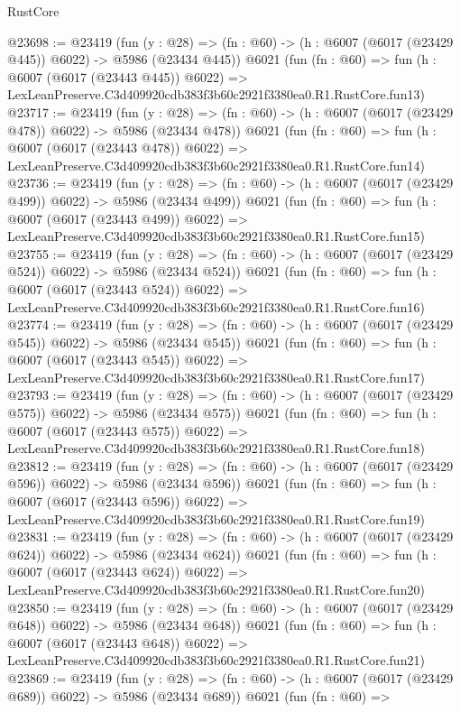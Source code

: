 \begin{lexlean}{RustCore}
\begin{coremodule}
@23698 := @23419
    (fun (y : @28) => (fn : @60) -> (h : @6007 (@6017 (@23429 @445)) @6022) -> @5986 (@23434 @445))
    @6021
    (fun (fn : @60) =>
    fun (h : @6007 (@6017 (@23443 @445)) @6022) =>
    LexLeanPreserve.C3d409920cdb383f3b60c2921f3380ea0.R1.RustCore.fun13)
@23717 := @23419
    (fun (y : @28) => (fn : @60) -> (h : @6007 (@6017 (@23429 @478)) @6022) -> @5986 (@23434 @478))
    @6021
    (fun (fn : @60) =>
    fun (h : @6007 (@6017 (@23443 @478)) @6022) =>
    LexLeanPreserve.C3d409920cdb383f3b60c2921f3380ea0.R1.RustCore.fun14)
@23736 := @23419
    (fun (y : @28) => (fn : @60) -> (h : @6007 (@6017 (@23429 @499)) @6022) -> @5986 (@23434 @499))
    @6021
    (fun (fn : @60) =>
    fun (h : @6007 (@6017 (@23443 @499)) @6022) =>
    LexLeanPreserve.C3d409920cdb383f3b60c2921f3380ea0.R1.RustCore.fun15)
@23755 := @23419
    (fun (y : @28) => (fn : @60) -> (h : @6007 (@6017 (@23429 @524)) @6022) -> @5986 (@23434 @524))
    @6021
    (fun (fn : @60) =>
    fun (h : @6007 (@6017 (@23443 @524)) @6022) =>
    LexLeanPreserve.C3d409920cdb383f3b60c2921f3380ea0.R1.RustCore.fun16)
@23774 := @23419
    (fun (y : @28) => (fn : @60) -> (h : @6007 (@6017 (@23429 @545)) @6022) -> @5986 (@23434 @545))
    @6021
    (fun (fn : @60) =>
    fun (h : @6007 (@6017 (@23443 @545)) @6022) =>
    LexLeanPreserve.C3d409920cdb383f3b60c2921f3380ea0.R1.RustCore.fun17)
@23793 := @23419
    (fun (y : @28) => (fn : @60) -> (h : @6007 (@6017 (@23429 @575)) @6022) -> @5986 (@23434 @575))
    @6021
    (fun (fn : @60) =>
    fun (h : @6007 (@6017 (@23443 @575)) @6022) =>
    LexLeanPreserve.C3d409920cdb383f3b60c2921f3380ea0.R1.RustCore.fun18)
@23812 := @23419
    (fun (y : @28) => (fn : @60) -> (h : @6007 (@6017 (@23429 @596)) @6022) -> @5986 (@23434 @596))
    @6021
    (fun (fn : @60) =>
    fun (h : @6007 (@6017 (@23443 @596)) @6022) =>
    LexLeanPreserve.C3d409920cdb383f3b60c2921f3380ea0.R1.RustCore.fun19)
@23831 := @23419
    (fun (y : @28) => (fn : @60) -> (h : @6007 (@6017 (@23429 @624)) @6022) -> @5986 (@23434 @624))
    @6021
    (fun (fn : @60) =>
    fun (h : @6007 (@6017 (@23443 @624)) @6022) =>
    LexLeanPreserve.C3d409920cdb383f3b60c2921f3380ea0.R1.RustCore.fun20)
@23850 := @23419
    (fun (y : @28) => (fn : @60) -> (h : @6007 (@6017 (@23429 @648)) @6022) -> @5986 (@23434 @648))
    @6021
    (fun (fn : @60) =>
    fun (h : @6007 (@6017 (@23443 @648)) @6022) =>
    LexLeanPreserve.C3d409920cdb383f3b60c2921f3380ea0.R1.RustCore.fun21)
@23869 := @23419
    (fun (y : @28) => (fn : @60) -> (h : @6007 (@6017 (@23429 @689)) @6022) -> @5986 (@23434 @689))
    @6021
    (fun (fn : @60) =>

\end{coremodule}
\end{lexlean}
